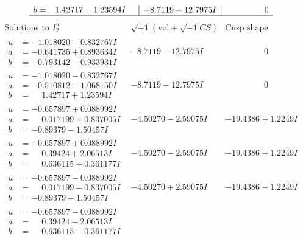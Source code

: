 \documentclass[1p]{elsarticle_modified}
\theoremstyle{definition}
\newcommand{\I}{\sqrt{-1}}
\begin{document}
$$\begin{array}{c|c|c}
\begin{aligned}
b &= \phantom{-}1.42717 - 1.23594 I\end{aligned}
 & -8.7119 + 12.7975 I & \phantom{-0.000000 } 0\\
 \hline 
 \end{array}$$\newpage$$\begin{array}{c|c|c}  
\text{Solutions to }I^u_{2}& \I (\text{vol} + \sqrt{-1}CS) & \text{Cusp shape}\\
 \hline 
\begin{aligned}
u &= -1.018020 - 0.832767 I \\
a &= -0.641735 + 0.893634 I \\
b &= -0.793142 - 0.933931 I\end{aligned}
 & -8.7119 - 12.7975 I & \phantom{-0.000000 } 0 \\ \hline\begin{aligned}
u &= -1.018020 - 0.832767 I \\
a &= -0.510812 - 1.068150 I \\
b &= \phantom{-}1.42717 + 1.23594 I\end{aligned}
 & -8.7119 - 12.7975 I & \phantom{-0.000000 } 0 \\ \hline\begin{aligned}
u &= -0.657897 + 0.088992 I \\
a &= \phantom{-}0.017199 + 0.837005 I \\
b &= -0.89379 - 1.50457 I\end{aligned}
 & -4.50270 - 2.59075 I & -19.4386 + 1.2249 I \\ \hline\begin{aligned}
u &= -0.657897 + 0.088992 I \\
a &= \phantom{-}0.39424 + 2.06513 I \\
b &= \phantom{-}0.636115 + 0.361177 I\end{aligned}
 & -4.50270 - 2.59075 I & -19.4386 + 1.2249 I \\ \hline\begin{aligned}
u &= -0.657897 - 0.088992 I \\
a &= \phantom{-}0.017199 - 0.837005 I \\
b &= -0.89379 + 1.50457 I\end{aligned}
 & -4.50270 + 2.59075 I & -19.4386 - 1.2249 I \\ \hline\begin{aligned}
u &= -0.657897 - 0.088992 I \\
a &= \phantom{-}0.39424 - 2.06513 I \\
b &= \phantom{-}0.636115 - 0.361177 I\end{aligned}

\end{array}$$
\end{document}
